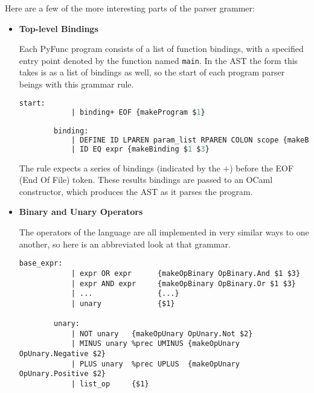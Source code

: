 \documentclass{l4proj}
\begin{document}
Here are a few of the more interesting parts of the parser grammer:
\begin{itemize}
    \item \textbf{Top-level Bindings}
    
    Each PyFunc program consists of a list of function bindings, with a specified entry point denoted by the function named \texttt{main}.
    In the AST the form this takes is as a list of bindings as well, so the start of each program parser beings with this grammar rule.

    \begin{lstlisting}[language=Caml, caption=PyFunc Parser's starting rule grammar.]
        start:
            | binding+ EOF {makeProgram $1}

        binding:
            | DEFINE ID LPAREN param_list RPAREN COLON scope {makeBinding $2 (makeFunc $2 $4 $7)}
            | ID EQ expr {makeBinding $1 $3}

    \end{lstlisting}

    The rule expects a series of bindings (indicated by the $+$) before the EOF (End Of File) token.
    These results bindings are passed to an OCaml constructor, which produces the AST as it parses the program.

    \item \textbf{Binary and Unary Operators}
    
    The operators of the language are all implemented in very similar ways to one another, so here is an abbreviated look at that grammar.
    \begin{lstlisting}[caption=An abrreviated version of PyFunc Parser's implementation of binary and unary operators.]
        base_expr:
            | expr OR expr      {makeOpBinary OpBinary.And $1 $3}
            | expr AND expr     {makeOpBinary OpBinary.Or $1 $3}
            | ...               {...}
            | unary             {$1}

        unary:
            | NOT unary   {makeOpUnary OpUnary.Not $2}
            | MINUS unary %prec UMINUS {makeOpUnary OpUnary.Negative $2}
            | PLUS unary  %prec UPLUS  {makeOpUnary OpUnary.Positive $2}
            | list_op     {$1}
    \end{lstlisting}


\end{itemize}
\end{document}
